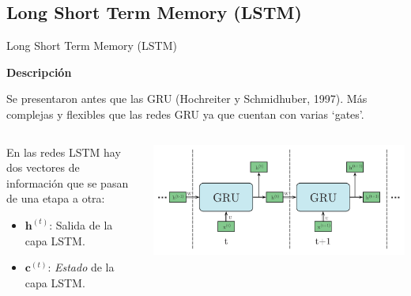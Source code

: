 \documentclass[aspectratio=169]{beamer}
\newenvironment{blockm}[1]{%
  \begin{block}{\textbf{#1}}%
  }{%
  \end{block}%
  \vspace{1em}%
}
\begin{document}
\subsection{Long Short Term Memory (LSTM)}


\begin{frame}{Long Short Term Memory (LSTM)}

	\begin{blockm}{Descripción}
		Se presentaron antes que las GRU (Hochreiter y Schmidhuber, 1997). Más complejas y flexibles que las redes GRU ya que cuentan con varias `gates'.
	\end{blockm}
	
	\begin{columns}
		\begin{column}{0.4\textwidth}
			En las redes LSTM hay dos vectores de información que se pasan de una etapa a otra:

			\begin{itemize}
				\item $ \mathbf{h}^{(t)} $: Salida de la capa LSTM.
				\item $ \mathbf{c}^{(t)} $: \textit{Estado} de la capa LSTM.
			\end{itemize}
		\end{column}

		\begin{column}{0.6\textwidth}
			\includegraphics[width=\textwidth, center]{imgs/tema4/rnn/GRUsec.pdf}
		\end{column}
	\end{columns}
\end{frame}
\end{document}
